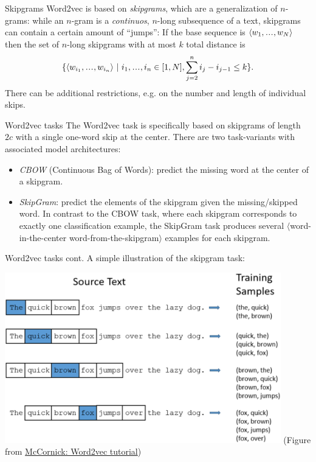 \documentclass[style=upen, size=14pt]{powerdot}
\newcommand\varlist{,\makebox[1em][c]{.\hfil.\hfil.},}
\newcommand{\gold}{\color{arany}}
\theoremstyle{definition}
\begin{document}
\begin{slide}[toc=Skipgrams]{Skipgrams}
  Word2vec is based on \emph{skipgrams}, which are a generalization of
  $n$-grams: while an $n$-gram is a \emph{continuos}, $n$-long subsequence of a
  text, skipgrams can contain a certain amount of ``jumps'': If the base
  sequence is $\langle w_1\varlist w_N\rangle$ then the set of $n$-long
  skipgrams with at most $k$ total distance is
  $$
  \{\langle w_{i_1} \varlist w_{i_n}\rangle~|~ i_1\varlist i_n\in[1, N],
  \sum_{j=2}^n i_j-i_{j-1} \leq k \}.
  $$
  There can be additional restrictions, e.g. on the number and length of
  individual skips.
\end{slide}

\begin{slide}[toc=Tasks]{Word2vec tasks}
  The Word2vec task is specifically based on skipgrams of length $2c$ with a
  single one-word skip at the center. There are two task-variants with
  associated model architectures:
  \begin{itemize}
  \item \emph{\gold CBOW} (Continuous Bag of Words): predict the missing word at
    the center of a skipgram. 
  \item \emph{\gold SkipGram}: predict the elements of the skipgram given the
    missing/skipped word. In contrast to the CBOW task, where each skipgram
    corresponds to exactly one classification example, the SkipGram task
    produces several $\langle$word-in-the-center word-from-the-skipgram$\rangle$
    examples for each skipgram.
  \end{itemize} 
\end{slide}

\begin{slide}[toc=]{Word2vec tasks cont.}
  A simple illustration of the skipgram task:
  \begin{center}
    \includegraphics[width=0.9\textwidth]{figures/skipgram.eps}
    \footnotesize{(Figure from \href{http://mccormickml.com/2016/04/19/word2vec-tutorial-the-skip-gram-model/}{McCornick: Word2vec tutorial})}
  \end{center}  
\end{slide}
\end{document}
